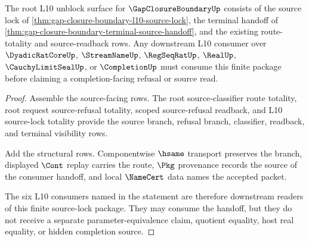 \begin{theorem}
\label{thm:gap-closure-boundary-root-l10-unblock-package}
The root L10 unblock surface for $\GapClosureBoundaryUp$ consists of the source lock of \autoref{thm:gap-closure-boundary-l10-source-lock}, the terminal handoff of \autoref{thm:gap-closure-boundary-terminal-source-handoff}, and the existing route-totality and source-readback rows. Any downstream L10 consumer over $\DyadicRatCoreUp$, $\StreamNameUp$, $\RegSeqRatUp$, $\RealUp$, $\CauchyLimitSealUp$, or $\CompletionUp$ must consume this finite package before claiming a completion-facing refusal or source read.
\end{theorem}
\begin{proof}
Assemble the source-facing rows. The root source-classifier route totality, root request source-refusal totality, scoped source-refusal readback, and L10 source-lock totality provide the source branch, refusal branch, classifier, readback, and terminal visibility rows.

Add the structural rows. Componentwise $\hsame$ transport preserves the branch, displayed $\Cont$ replay carries the route, $\Pkg$ provenance records the source of the consumer handoff, and local $\NameCert$ data names the accepted packet.

The six L10 consumers named in the statement are therefore downstream readers of this finite source-lock package. They may consume the handoff, but they do not receive a separate parameter-equivalence claim, quotient equality, host real equality, or hidden completion source.
\end{proof}
